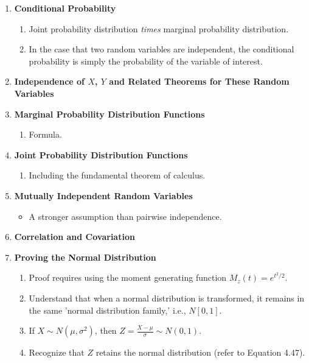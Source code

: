 \documentclass{article}
\begin{document}
\begin{enumerate}
    \item \textbf{Conditional Probability}
    \begin{enumerate}
        \item Joint probability distribution \textit{times} marginal probability distribution.
        \item In the case that two random variables are independent, the conditional probability is simply the probability of the variable of interest.
    \end{enumerate}

    \item \textbf{Independence of \(X\), \(Y\) and Related Theorems for These Random Variables}

    \item \textbf{Marginal Probability Distribution Functions}
    \begin{enumerate}
        \item Formula.
    \end{enumerate}

    \item \textbf{Joint Probability Distribution Functions}
    \begin{enumerate}
        \item Including the fundamental theorem of calculus.
    \end{enumerate}

    \item \textbf{Mutually Independent Random Variables} 
    \begin{itemize}
        \item A stronger assumption than pairwise independence.
    \end{itemize}

    \item \textbf{Correlation and Covariation}

    \item \textbf{Proving the Normal Distribution}
    \begin{enumerate}
        \item Proof requires using the moment generating function \(M_z(t) = e^{t^2/2}\).
        \item Understand that when a normal distribution is transformed, it remains in the same 'normal distribution family,' i.e., \(N[0,1]\).
        \item If \(X \sim N(\mu, \sigma^2)\), then \(Z = \frac{X - \mu}{\sigma} \sim N(0,1)\).
        \item Recognize that \(Z\) retains the normal distribution (refer to Equation 4.47).
    \end{enumerate}


\end{enumerate}
\end{document}
